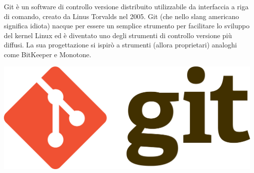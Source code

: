 \documentclass[twoside]{supsistudent}
\begin{document}
\bigskip
\noindent
\begin{minipage}[H]{0.49\textwidth} 
  \begin{flushleft}
    Git è un software di controllo versione distribuito utilizzabile da interfaccia a riga di comando, creato da Linus Torvalds nel 2005.
    Git (che nello slang americano significa idiota) nacque per essere un semplice strumento per facilitare lo sviluppo del kernel Linux 
    ed è diventato uno degli strumenti di controllo versione più diffusi. La sua progettazione si ispirò a strumenti (allora proprietari) 
    analoghi come BitKeeper e Monotone.
  \end{flushleft}
  \end{minipage}
\hfill
\begin{minipage}[H]{0.49\textwidth}
  \begin{center}
    \includegraphics[scale=0.08]{images/git.png}
  \end{center}
\end{minipage}
\end{document}
